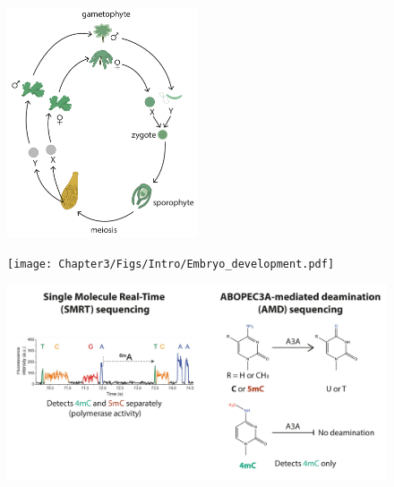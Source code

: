 \begin{figure}[htbp!] 
\centering    
    \includegraphics[width=0.5\textwidth]{Chapter3/Figs/Intro/Marchantia_lifecycle.pdf}
\caption{}
\label{fig:Mp_lifecycle}
\captionsetup{font=small}
    \caption*{}
\end{figure}

\begin{figure}[htbp!] 
\centering    
    \texttt{[image: Chapter3/Figs/Intro/Embryo\_development.pdf]}
\caption{}
\label{fig:Mp_embryo_dev}
\captionsetup{font=small}
    \caption*{}
\end{figure}
\begin{figure}[htbp!] 
\centering    
    \includegraphics[width=1\textwidth]{Chapter3/Figs/Intro/Sequencing_techs.pdf}
\caption{}
\label{fig:Mp_seq_techs}
\captionsetup{font=small}
    \caption*{}
\end{figure}

